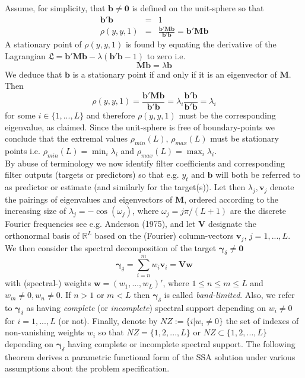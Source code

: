 \documentclass[a4paper]{article}
\begin{document}
Assume, for simplicity, that $\mathbf{b}\neq\mathbf{0}$ is defined on the unit-sphere so that  
\begin{eqnarray*}
\mathbf{b'b}&=&1\\
\rho(y,y,1)&=&\frac{\mathbf{b'Mb}}{\mathbf{b'b}}=\mathbf{b'Mb}
\end{eqnarray*}
A stationary point of $\rho(y,y,1)$ is found by equating the derivative of the Lagrangian $\mathfrak{L}=\mathbf{b'Mb}-\lambda(\mathbf{b'b}-1)$ to zero i.e.
\[
\mathbf{Mb}=\lambda\mathbf{b}
\]
We deduce that $\mathbf{b}$ is a stationary point if and only if it is an eigenvector of $\mathbf{M}$. Then 
\[
\rho(y,y,1)=\frac{\mathbf{b}'\mathbf{Mb}}{\mathbf{b}'\mathbf{b}}=\lambda_i\frac{\mathbf{b}'\mathbf{b}}{\mathbf{b}'\mathbf{b}}=\lambda_i
\]
for some $i\in\{1,...,L\}$ and therefore $\rho(y,y,1)$ must be the corresponding eigenvalue, as claimed. Since the  unit-sphere is free of boundary-points we conclude that the extremal values $\rho_{min}(L)$, $\rho_{max}(L)$ must be stationary points i.e. $\rho_{min}(L)=\min_i\lambda_i$ and $\rho_{max}(L)=\max_i\lambda_i$.\\


By abuse of terminology we  now identify filter coefficients and corresponding filter outputs (targets or predictors) so that e.g. $y_t$ and $\mathbf{b}$ will  both be referred to as predictor or estimate (and similarly for the target(s)).  
Let then   $\lambda_{j},\mathbf{v}_{j}$ denote the pairings of eigenvalues and eigenvectors of $\mathbf{M}$, ordered according to the increasing size of $\lambda_{j}=-\cos(\omega_j)$, where $\omega_j=j\pi /(L+1)$ are the discrete Fourier frequencies see e.g. Anderson (1975), 
and let $\mathbf{V}$ designate the orthonormal basis of $\mathbb{R}^{L}$ based on the (Fourier) column-vectors $\mathbf{v}_j$, $j=1,...,L$. We then consider  the spectral decomposition of the target $\boldsymbol{\gamma}_{\delta}\neq \mathbf{0}$   
\begin{equation}\label{specdec}
\boldsymbol{\gamma}_{\delta}=\sum_{i=n}^{m}w_i\mathbf{v}_i=\mathbf{V}\mathbf{w}
\end{equation}
with (spectral-) weights $\mathbf{w}=(w_1,...,w_L)'$,  where $1\leq n\leq m \leq L$ and  $w_{m}\neq 0,w_n\neq 0$. %
If $n>1$ or $m<L$ then $\boldsymbol{\gamma}_{\delta}$ is called \emph{band-limited}. Also, we refer to $\boldsymbol{\gamma}_{\delta}$ as having \emph{complete} (or \emph{incomplete}) spectral support depending on $w_i\neq 0$ for $i=1,...,L$ (or not). %
Finally, denote by $NZ:=\{i|w_i\neq 0\}$ the set of indexes of  non-vanishing weights $w_i$ so that $NZ=\{1,2,...,L\}$ or $NZ\subset \{1,2,...,L\}$ depending on $\boldsymbol{\gamma}_{\delta}$ having complete or incomplete spectral support. The following theorem derives a parametric functional form of the SSA solution under various assumptions about the problem specification.
\end{document}
